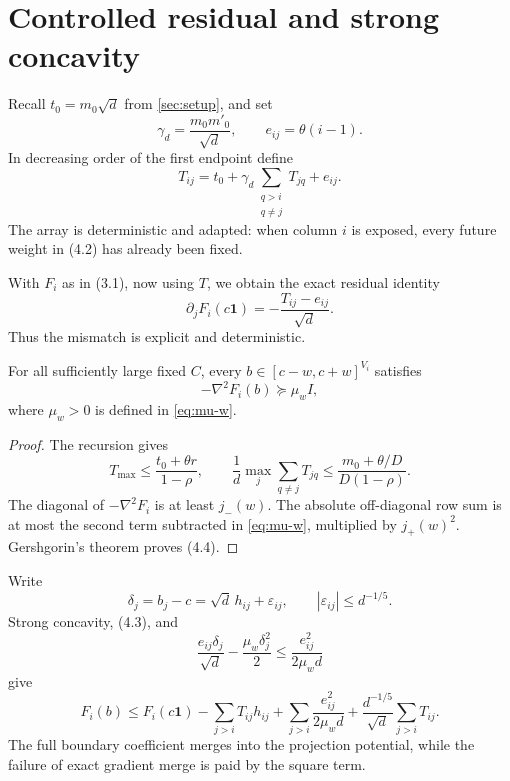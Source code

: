 \section{Controlled residual and strong concavity}\label{sec:residual}

Recall \(t_0=m_0\sqrt d\) from \cref{sec:setup}, and set
\[
 \gamma_d=\frac{m_0m'_0}{\sqrt d},\qquad
 e_{ij}=\theta(i-1).
\tag{4.1}
\]
In decreasing order of the first endpoint define
\[
 T_{ij}=t_0+\gamma_d
 \sum_{\substack{q>i\\q\ne j}}T_{jq}+e_{ij}.
\tag{4.2}
\]
The array is deterministic and adapted: when column \(i\) is exposed, every
future weight in (4.2) has already been fixed.

With \(F_i\) as in (3.1), now using \(T\), we obtain the exact residual
identity
\[
 \partial_jF_i(c\mathbf1)=-\frac{T_{ij}-e_{ij}}{\sqrt d}.
\tag{4.3}
\]
Thus the mismatch is explicit and deterministic.

\begin{lemma}\label{lem:hessian}
For all sufficiently large fixed \(C\), every
\(b\in[c-w,c+w]^{V_i}\) satisfies
\[
 -\nabla^2F_i(b)\succeq\mu_w I,
\tag{4.4}
\]
where \(\mu_w>0\) is defined in \eqref{eq:mu-w}.
\end{lemma}

\begin{proof}
The recursion gives
\[
 T_{\max}\le\frac{t_0+\theta r}{1-\rho},\qquad
 \frac1d\max_j\sum_{q\ne j}T_{jq}
 \le\frac{m_0+\theta/D}{D(1-\rho)}.
\]
The diagonal of \(-\nabla^2F_i\) is at least \(j_-(w)\).  The absolute
off-diagonal row sum is at most the second term subtracted in
\eqref{eq:mu-w}, multiplied
by \(j_+(w)^2\).  Gershgorin's theorem proves (4.4).
\end{proof}

Write
\[
 \delta_j=b_j-c=\sqrt d\,h_{ij}+\varepsilon_{ij},\qquad
 |\varepsilon_{ij}|\le d^{-1/5}.
\]
Strong concavity, (4.3), and
\[
 \frac{e_{ij}\delta_j}{\sqrt d}-\frac{\mu_w\delta_j^2}{2}
 \le\frac{e_{ij}^2}{2\mu_wd}
\tag{4.5}
\]
give
\[
F_i(b)\le F_i(c\mathbf1)-\sum_{j>i}T_{ij}h_{ij}
+\sum_{j>i}\frac{e_{ij}^2}{2\mu_wd}
+\frac{d^{-1/5}}{\sqrt d}\sum_{j>i}T_{ij}.
\tag{4.6}
\]
The full boundary coefficient merges into the projection potential, while the
failure of exact gradient merge is paid by the square term.
